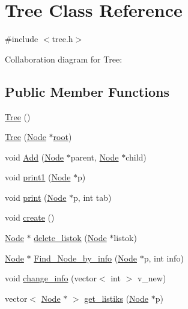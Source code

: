 \hypertarget{class_tree}{}\section{Tree Class Reference}
\label{class_tree}


{\ttfamily \#include $<$tree.\+h$>$}



Collaboration diagram for Tree\+:
\subsection*{Public Member Functions}
\begin{DoxyCompactItemize}
\item 
\mbox{\hyperlink{class_tree_ad376a7c639d857312f5de2ef47482f68}{Tree}} ()
\item 
\mbox{\hyperlink{class_tree_ac81e597c6214a8b3ab5bd0c0a1d52c27}{Tree}} (\mbox{\hyperlink{class_node}{Node}} $\ast$\mbox{\hyperlink{class_tree_ad8e46ce0aead5778cbdd784d1e370d5f}{root}})
\item 
void \mbox{\hyperlink{class_tree_a2fd711fc3360481e87185a7a70615865}{Add}} (\mbox{\hyperlink{class_node}{Node}} $\ast$parent, \mbox{\hyperlink{class_node}{Node}} $\ast$child)
\item 
void \mbox{\hyperlink{class_tree_acc690f24219bb3816a7552b443bfb02b}{print1}} (\mbox{\hyperlink{class_node}{Node}} $\ast$p)
\item 
void \mbox{\hyperlink{class_tree_ad041f83eddd83c74f689dae8283c054f}{print}} (\mbox{\hyperlink{class_node}{Node}} $\ast$p, int tab)
\item 
void \mbox{\hyperlink{class_tree_a95ad032dcc32977751fa60d4715f7c18}{create}} ()
\item 
\mbox{\hyperlink{class_node}{Node}} $\ast$ \mbox{\hyperlink{class_tree_a0059ab7470d1df6b88ec6d275067bcdb}{delete\+\_\+listok}} (\mbox{\hyperlink{class_node}{Node}} $\ast$listok)
\item 
\mbox{\hyperlink{class_node}{Node}} $\ast$ \mbox{\hyperlink{class_tree_a16def61abcbc1dbb631a664e7bb02c98}{Find\+\_\+\+Node\+\_\+by\+\_\+info}} (\mbox{\hyperlink{class_node}{Node}} $\ast$p, int info)
\item 
void \mbox{\hyperlink{class_tree_a83de2e5a9d0269b1d4a136533b288d19}{change\+\_\+info}} (vector$<$ int $>$ v\+\_\+new)
\item 
vector$<$ \mbox{\hyperlink{class_node}{Node}} $\ast$ $>$ \mbox{\hyperlink{class_tree_a8713847783793b6d5b0580b34d406f6d}{get\+\_\+listiks}} (\mbox{\hyperlink{class_node}{Node}} $\ast$p)

\end{DoxyCompactItemize}
